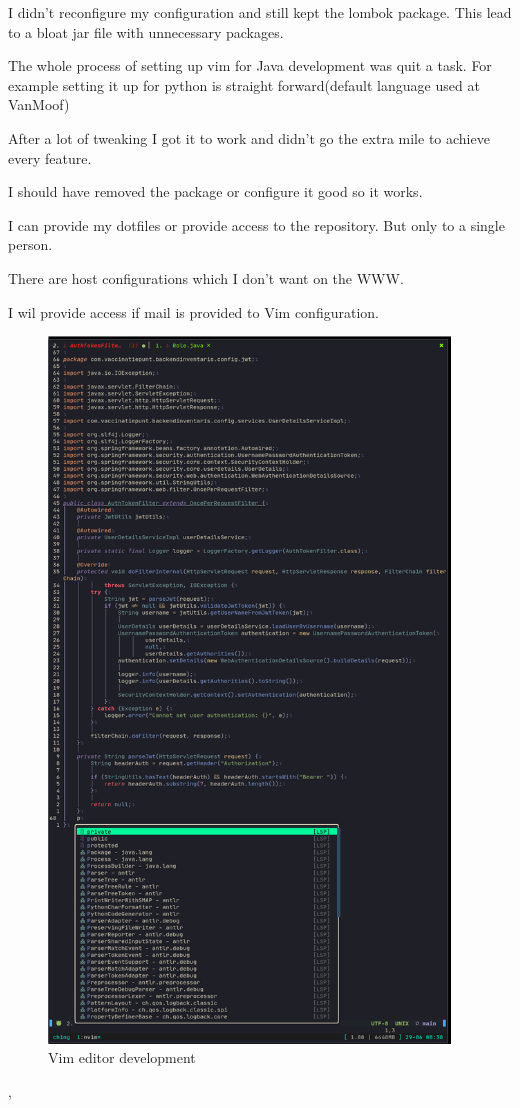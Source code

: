 {{{		}
		{%
			I didn't reconfigure my configuration and still kept the lombok package.
			This lead to a bloat jar file with unnecessary packages.
		}
		{%
			The whole process of setting up vim for Java development was quit a task.
			For example setting it up for python is straight forward(default language used at VanMoof)

			After a lot of tweaking I got it to work and didn't go the extra mile to achieve every feature.

			I should have removed the package or configure it good so it works.
		}
		{
			I can provide my dotfiles or provide access to the repository.
			But only to a single person.

			There are host configurations which I don't want on the WWW.
		}
	}
	{%
		\label{bewijs:learn}
		I wil provide access if mail is provided to Vim configuration.
		\begin{figure}
			\begin{center}
				\includegraphics[width=0.95\textwidth]{images/vim.png}
			\end{center}
			\caption{Vim editor development}
			\label{fig:vim}
		\end{figure}

	},
}
